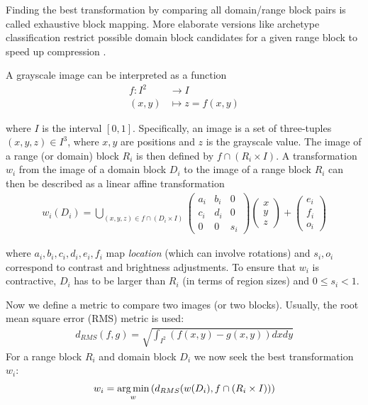 Finding the best transformation by comparing all domain/range block pairs is
called exhaustive block mapping. More elaborate versions like archetype
classification restrict possible domain block candidates for a given range block
to speed up compression \cite{jacobs1992image}.

 A grayscale image can be interpreted as a function
\begin{align*}
    f \colon I^2 &\to I\\
    (x,y) &\mapsto z = f(x,y)
\end{align*}

where $I$ is the interval $[0,1]$. Specifically, an image is a set of three-tuples $(x,y,z) \in I^3$, where $x,y$ are positions and $z$ is the grayscale value.
The image of a range (or domain) block $R_i$ is then defined by $f \cap (R_i \times I)$.
A transformation $w_i$ from the image of a domain block $D_i$ to the image of a range block $R_i$ can then be described as a linear affine transformation
\begin{align*}
w_i(D_i) = \bigcup_{(x,y,z) \in f \cap (D_i \times I)} \begin{pmatrix} a_i & b_i & 0 \\ c_i & d_i & 0 \\ 0 & 0 & s_i \end{pmatrix} \begin{pmatrix} x\\y\\z \end{pmatrix} + \begin{pmatrix} e_i\\f_i\\o_i \end{pmatrix}
\end{align*}

where $a_i, b_i, c_i, d_i, e_i, f_i$ map \textit{location} (which can involve rotations) and $s_i, o_i$ correspond to contrast and brightness adjustments.
To ensure that $w_i$ is contractive, $D_i$ has to be larger than $R_i$ (in terms of region sizes) and $0 \leq s_i < 1$.

Now we define a metric to compare two images (or two blocks). Usually, the root mean square error (RMS) metric is used:
\begin{align*}
d_{RMS}(f,g) = \sqrt{\int_{I^2} (f(x,y)-g(x,y))dxdy}
\end{align*}
For a range block $R_i$ and domain block $D_i$ we now seek the best
transformation $w_i$:
\begin{align}
  w_i = \operatorname*{arg\,min}_{w} \left( d_{RMS}(w(D_i), f \cap (R_i \times I)) \right)\label{eq:min-problem}
\end{align}

